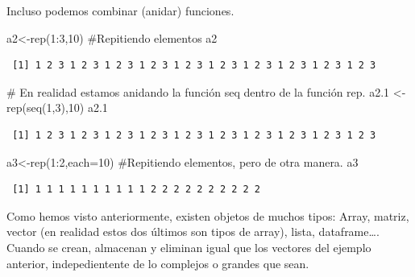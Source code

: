 \documentclass[
  letterpaper,
  DIV=11,
  numbers=noendperiod]{scrreprt}
\newenvironment{Shaded}{\begin{snugshade}}{\end{snugshade}}
\newcommand{\AttributeTok}[1]{\textcolor[rgb]{0.40,0.45,0.13}{#1}}
\newcommand{\CommentTok}[1]{\textcolor[rgb]{0.37,0.37,0.37}{#1}}
\newcommand{\DecValTok}[1]{\textcolor[rgb]{0.68,0.00,0.00}{#1}}
\newcommand{\FloatTok}[1]{\textcolor[rgb]{0.68,0.00,0.00}{#1}}
\newcommand{\FunctionTok}[1]{\textcolor[rgb]{0.28,0.35,0.67}{#1}}
\newcommand{\NormalTok}[1]{\textcolor[rgb]{0.00,0.23,0.31}{#1}}
\newcommand{\OtherTok}[1]{\textcolor[rgb]{0.00,0.23,0.31}{#1}}
\newcommand{\SpecialCharTok}[1]{\textcolor[rgb]{0.37,0.37,0.37}{#1}}
\begin{document}
Incluso podemos combinar (anidar) funciones.

\begin{Shaded}
\begin{Highlighting}[]
\NormalTok{a2}\OtherTok{\textless{}{-}}\FunctionTok{rep}\NormalTok{(}\DecValTok{1}\SpecialCharTok{:}\DecValTok{3}\NormalTok{,}\DecValTok{10}\NormalTok{) }\CommentTok{\#Repitiendo elementos}
\NormalTok{a2}
\end{Highlighting}
\end{Shaded}

\begin{verbatim}
 [1] 1 2 3 1 2 3 1 2 3 1 2 3 1 2 3 1 2 3 1 2 3 1 2 3 1 2 3 1 2 3
\end{verbatim}

\begin{Shaded}
\begin{Highlighting}[]
\CommentTok{\# En realidad estamos anidando la función seq dentro de la función rep. }
\NormalTok{a2}\FloatTok{.1} \OtherTok{\textless{}{-}} \FunctionTok{rep}\NormalTok{(}\FunctionTok{seq}\NormalTok{(}\DecValTok{1}\NormalTok{,}\DecValTok{3}\NormalTok{),}\DecValTok{10}\NormalTok{)}
\NormalTok{a2}\FloatTok{.1}
\end{Highlighting}
\end{Shaded}

\begin{verbatim}
 [1] 1 2 3 1 2 3 1 2 3 1 2 3 1 2 3 1 2 3 1 2 3 1 2 3 1 2 3 1 2 3
\end{verbatim}

\begin{Shaded}
\begin{Highlighting}[]
\NormalTok{a3}\OtherTok{\textless{}{-}}\FunctionTok{rep}\NormalTok{(}\DecValTok{1}\SpecialCharTok{:}\DecValTok{2}\NormalTok{,}\AttributeTok{each=}\DecValTok{10}\NormalTok{) }\CommentTok{\#Repitiendo elementos, pero de otra manera.}
\NormalTok{a3}
\end{Highlighting}
\end{Shaded}

\begin{verbatim}
 [1] 1 1 1 1 1 1 1 1 1 1 2 2 2 2 2 2 2 2 2 2
\end{verbatim}

Como hemos visto anteriormente, existen objetos de muchos tipos: Array,
matriz, vector (en realidad estos dos últimos son tipos de array),
lista, dataframe\ldots. Cuando se crean, almacenan y eliminan igual que
los vectores del ejemplo anterior, indepedientente de lo complejos o
grandes que sean.
\end{document}
